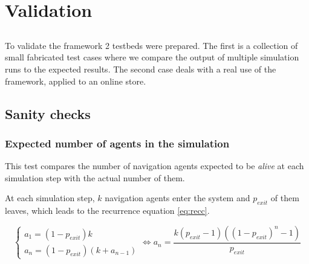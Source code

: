 \chapter{Validation} \label{chap:validation}

\section*{}


To validate the framework 2 testbeds were prepared. The first is a collection 
of small fabricated test cases where we compare the output of multiple 
simulation runs to the expected results. The second case deals with a real use 
of the framework, applied to an online store.


\section{Sanity checks} %

\subsection{Expected number of agents in the simulation}

This test compares the number of navigation agents expected to be 
\textit{alive} at each simulation step with the actual number of them.

At each simulation step, $k$ navigation agents enter the system and  
$p_{exit}$ of them leaves, which leads to the recurrence equation \ref{eq:recc}.

\begin{equation}\label{eq:recc}
\begin{cases}
a_{1} = \left (1 - p_{exit}  \right ) k\\
a_{n} = \left (1 - p_{exit}  \right ) \left (k + a_{n - 1} \right)
\end{cases} \Leftrightarrow a_{n} = \frac{k (p_{exit}-1) ((1-p_{exit})^{n} - 
1)}{p_{exit}}
\end{equation}

